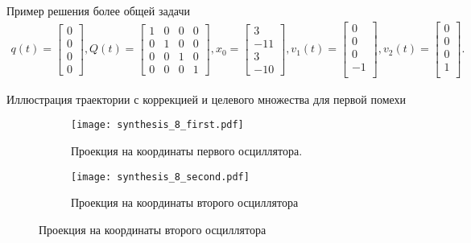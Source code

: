 \documentclass{beamer}
\begin{document}
\begin{frame}{Пример решения более общей задачи}
\begin{gather*}
    q(t) = \begin{bmatrix}
        0 \\[0.3em]
        0 \\[0.3em]
        0 \\[0.3em]
        0
    \end{bmatrix},
    Q(t) = \begin{bmatrix}
        1 & 0 & 0 & 0 \\[0.3em]
        0 & 1 & 0 & 0 \\[0.3em]
        0 & 0 & 1 & 0 \\[0.3em]
        0 & 0 & 0 & 1
    \end{bmatrix},
    x_0 = \begin{bmatrix}
        3 \\[0.3em]
        -11 \\[0.3em]
        3 \\[0.3em]
        -10
    \end{bmatrix},
    v_1(t) = \begin{bmatrix}
        0 \\[0.3em]
        0 \\[0.3em]
        0 \\[0.3em]
        -1 \\[0.3em]
    \end{bmatrix},
    v_2(t) = \begin{bmatrix}
        0 \\[0.3em]
        0 \\[0.3em]
        0 \\[0.3em]
        1 \\[0.3em]
    \end{bmatrix}.
  \end{gather*}
\end{frame}

\begin{frame}{Иллюстрация траектории с коррекцией и целевого множества для первой помехи}

    \begin{figure}[ht]
    \centering
    \begin{subfigure}[b]{0.45\textwidth}
        \centering
        \texttt{[image: synthesis\_8\_first.pdf]}
        \caption{Проекция на координаты первого осциллятора.}
        \label{subfig:synthesis_1_first}
    \end{subfigure}
    \hfill
    \begin{subfigure}[b]{0.45\textwidth}
        \centering
        \texttt{[image: synthesis\_8\_second.pdf]}
        \caption{Проекция на координаты второго осциллятора}
        \label{subfig:synthesis_1_second}
    \end{subfigure}
    \label{fig:synthesis_1}
    \end{figure}
    
\end{frame}
    
\end{document}
